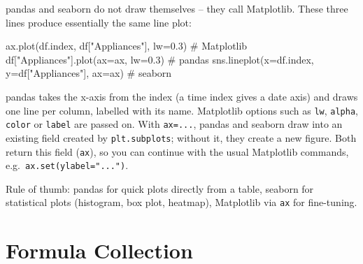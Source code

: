 \documentclass[
  letterpaper,
  DIV=11,
  numbers=noendperiod]{scrreprt}
\newenvironment{Shaded}{\begin{snugshade}}{\end{snugshade}}
\newcommand{\CommentTok}[1]{\textcolor[rgb]{0.37,0.37,0.37}{#1}}
\newcommand{\FloatTok}[1]{\textcolor[rgb]{0.68,0.00,0.00}{#1}}
\newcommand{\NormalTok}[1]{\textcolor[rgb]{0.00,0.23,0.31}{#1}}
\newcommand{\OperatorTok}[1]{\textcolor[rgb]{0.37,0.37,0.37}{#1}}
\newcommand{\StringTok}[1]{\textcolor[rgb]{0.13,0.47,0.30}{#1}}
\begin{document}
\begin{tcolorbox}[enhanced jigsaw, left=2mm, title=\textcolor{quarto-callout-tip-color}{\faLightbulb}\hspace{0.5em}{pandas, seaborn and Matplotlib}, opacityback=0, breakable, rightrule=.15mm, arc=.35mm, toptitle=1mm, colbacktitle=quarto-callout-tip-color!10!white, opacitybacktitle=0.6, coltitle=black, colframe=quarto-callout-tip-color-frame, bottomrule=.15mm, leftrule=.75mm, bottomtitle=1mm, titlerule=0mm, toprule=.15mm, colback=white]

pandas and seaborn do not draw themselves -- they call Matplotlib. These
three lines produce essentially the same line plot:

\begin{Shaded}
\begin{Highlighting}[]
\NormalTok{ax.plot(df.index, df[}\StringTok{"Appliances"}\NormalTok{], lw}\OperatorTok{=}\FloatTok{0.3}\NormalTok{)        }\CommentTok{\# Matplotlib}
\NormalTok{df[}\StringTok{"Appliances"}\NormalTok{].plot(ax}\OperatorTok{=}\NormalTok{ax, lw}\OperatorTok{=}\FloatTok{0.3}\NormalTok{)                }\CommentTok{\# pandas}
\NormalTok{sns.lineplot(x}\OperatorTok{=}\NormalTok{df.index, y}\OperatorTok{=}\NormalTok{df[}\StringTok{"Appliances"}\NormalTok{], ax}\OperatorTok{=}\NormalTok{ax) }\CommentTok{\# seaborn}
\end{Highlighting}
\end{Shaded}

pandas takes the x-axis from the index (a time index gives a date axis)
and draws one line per column, labelled with its name. Matplotlib
options such as \texttt{lw}, \texttt{alpha}, \texttt{color} or
\texttt{label} are passed on. With \texttt{ax=...}, pandas and seaborn
draw into an existing field created by \texttt{plt.subplots}; without
it, they create a new figure. Both return this field (\texttt{ax}), so
you can continue with the usual Matplotlib commands,
e.g.~\texttt{ax.set(ylabel="...")}.

Rule of thumb: pandas for quick plots directly from a table, seaborn for
statistical plots (histogram, box plot, heatmap), Matplotlib via
\texttt{ax} for fine-tuning.

\end{tcolorbox}

\chapter{Formula Collection}\label{sec-formulas}
\end{document}
